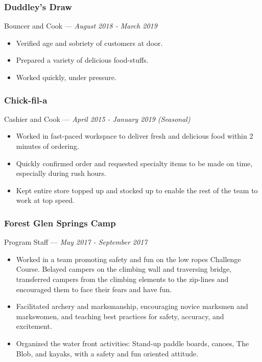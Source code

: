 \documentclass[letterpaper,10pt]{article}
\begin{document}
    \subsubsection{Duddley's Draw}
    \hfill Bouncer and Cook --- \emph{August 2018 - March 2019}

    \begin{itemize}
        \tightlist{}
        \item 
        Verified age and sobriety of customers at door.
        \item
        Prepared a variety of delicious food-stuffs.
        \item
        Worked quickly, under pressure.
    \end{itemize}


    \subsubsection{Chick-fil-a}
    \hfill Cashier and Cook --- \emph{April 2015 - January 2019 (Seasonal)}

    \begin{itemize}
        \tightlist{}
        \item
        Worked in fast-paced workspace to deliver fresh and delicious food within 2 minutes of ordering.
        \item
        Quickly confirmed order and requested specialty items to be made on time, especially during rush hours.
        \item
        Kept entire store topped up and stocked up to enable the rest of the team to work at top speed.
    \end{itemize}

    \subsubsection{Forest Glen Springs Camp}
    \hfill Program Staff --- \emph{May 2017 - September 2017}

    \begin{itemize}
        \tightlist{}
        \item
        Worked in a team promoting safety and fun on the low ropes Challenge Course.
        Belayed campers on the climbing wall and traversing bridge, transferred campers from the climbing elements to the zip-lines and encouraged them to face their fears and have fun.
        \item
        Facilitated archery and marksmanship, encouraging novice marksmen and markswomen, and teaching best practices for safety, accuracy, and excitement.
        \item
        Organized the water front activities: Stand-up paddle boards, canoes, The Blob, and kayaks, with a safety and fun oriented attitude.
    \end{itemize}
\end{document}
